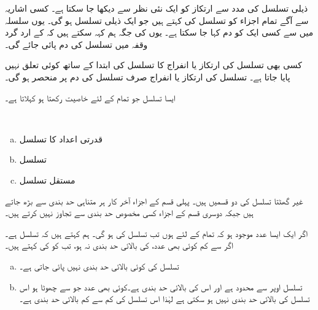 ذیلی تسلسل کی مدد سے ارتکاز کو ایک نئی نظر سے دیکھا جا سکتا ہے۔ کسی اشاریہ  سے آگے  تمام اجزاء کو تسلسل کی  کہتے ہیں جو ایک ذیلی تسلسل ہو گی۔ یوں سلسلہ  میں سے کسی ایک کو دم کہا جا سکتا ہے۔ یوں  کی جگہ ہم کہہ سکتے ہیں کہ  کے ارد گرد  وقفہ میں تسلسل کی دم پائی جائے گی۔

کسی بھی تسلسل کی ارتکاز یا انفراج کا تسلسل کی ابتدا کے ساتھ کوئی تعلق نہیں پایا جاتا ہے۔ تسلسل کی ارتکاز یا انفراج صرف تسلسل کی دم پر منحصر ہو گی۔

ایسا تسلسل جو تمام  کے لئے  خاصیت رکھتا ہو  کہلاتا ہے۔ 

\\
\begin{enumerate}[a.]
\item
قدرتی اعداد کا تسلسل 
\item
تسلسل 
\item
مستقل تسلسل 
\end{enumerate}

غیر گھٹتا تسلسل کی دو قسمیں ہیں۔ پہلی قسم کے اجزاء آخر کار ہر متناہی حد بندی سے بڑھ جاتے ہیں جبکہ دوسری قسم کے اجزاء کسی مخصوص حد بندی سے تجاوز نہیں کرتے ہیں۔

اگر ایک ایسا عدد  موجود ہو کہ تمام  کے لئے  ہوں تب تسلسل  کی   ہو گی۔ ہم کہتے ہیں کہ تسلسل   ہے۔ اگر  سے کم کوئی بھی عدد،  کی بالائی حد بندی نہ ہو، تب  کو  کی  کہتے ہیں۔

\begin{enumerate}[a.]
\item
تسلسل  کی کوئی بالائی حد بندی نہیں پائی جاتی ہے۔
\item
تسلسل  اوپر سے محدود ہے اور اس کی بالائی حد بندی  ہے۔کوئی بھی عدد جو  سے چھوٹا ہو اس تسلسل کی بالائی حد بندی نہیں ہو سکتی ہے لہٰذا اس تسلسل کی کم سے کم بالائی حد بندی  ہے۔
\end{enumerate}


